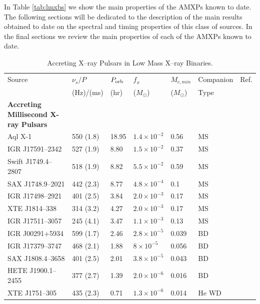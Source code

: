 \documentclass[graybox]{svmult}
\begin{document}
In Table \ref{tab:lmxbs} we show the main properties of the AMXPs known to date. The following sections will be dedicated to the description of the main results obtained to date on the spectral and timing properties of this class of sources. In the final sections we review the main properties of each of the AMXPs known to date. 



\begin{table}
\caption{Accreting X--ray Pulsars in Low Mass X--ray Binaries.}
\scriptsize
\begin{center}
\begin{tabular}{lllllll}
\hline
\hline
Source & $\nu_{s}/P$ & $P_{\rm orb}$ & $f_{x}$  & $M_{c,min}$  & Companion  & Ref.\\
 & (Hz)/(ms) & (hr) & ($M_{\odot}$) & ($M_{\odot}$) &   Type & \\
\hline
\textbf{Accreting Millisecond X-ray Pulsars}\\
\hline
Aql X-1     & 550 (1.8) &  18.95 & $1.4\times 10^{-2}$ & 0.56 & MS & \cite{Casella2008,MataSanchez2017}\\
IGR J17591--2342 & 527 (1.9) &  8.80 & $1.5\times 10^{-2}$ & 0.37 & MS & \cite{Sanna2018c}\\
Swift J1749.4--2807 & 518 (1.9) & 8.82 & $5.5\times 10^{-2}$ & 0.59 & MS & \cite{Altamirano2011,DAvanzo2011}\\
SAX J1748.9--2021  & 442 (2.3) & 8.77 &  $4.8\times 10^{-4}$ & 0.1  & MS& \cite{Altamirano2008,Cadelano2017}\\
IGR J17498--2921 & 401 (2.5) & 3.84 & $2.0\times10^{-3}$ & 0.17 & MS & \cite{Papitto2011b}\\
XTE J1814--338  & 314  (3.2) & 4.27 & $2.0\times 10^{-3}$ & 0.17 & MS  & \cite{Markwardt2003,Wang2017}\\
IGR J17511--3057 & 245 (4.1) &  3.47 & $1.1\times 10^{-3}$ & 0.13  & MS & \cite{Papitto2010}\\
\hline
IGR J00291+5934    & 599  (1.7) & 2.46 & $2.8\times 10^{-5}$ & 0.039  &  BD & \cite{Galloway2005}\\
IGR J17379--3747    & 468  (2.1) & 1.88 & $8\times 10^{-5}$ & 0.056  &  BD & \cite{Sanna2018c}\\
SAX J1808.4--3658 & 401 (2.5) &  2.01 & $3.8\times 10^{-5}$ & 0.043  & BD &  \cite{Wijnands1998,Wang2013}\\
HETE J1900.1--2455& 377  (2.7) &   1.39 & $2.0\times 10^{-6}$ & 0.016  & BD  & \cite{Kaaret2006,Elebert2008}\\
\hline
XTE J1751--305 & 435 (2.3) &  0.71 & $1.3\times 10^{-6}$ & 0.014  & He WD &   \cite{Markwardt2002,DAvanzo2009}\\

\end{tabular}
\end{center}
\end{table}
\end{document}
